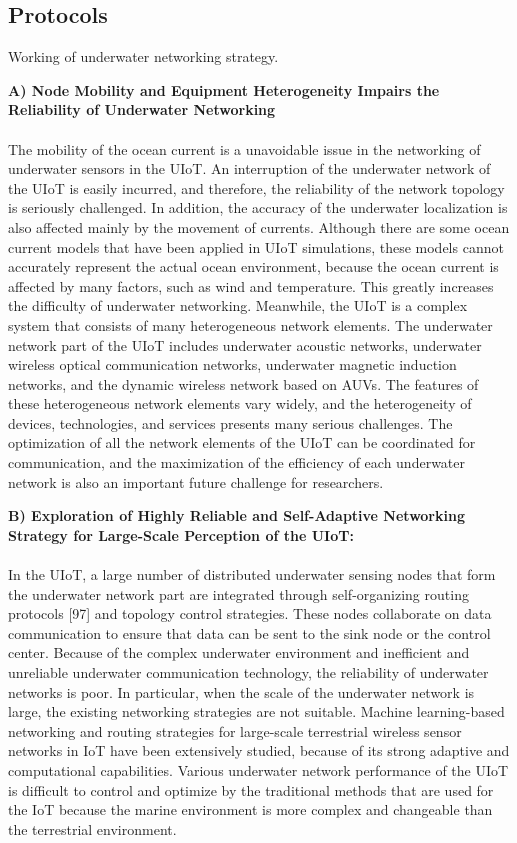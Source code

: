 \documentclass[a4paper,12pt]{article}
\begin{document}
\begin{multicols}{2}
\section{Protocols}
Working of underwater networking strategy.
\\
\item \textbf{A)	Node Mobility and Equipment Heterogeneity Impairs the Reliability of Underwater Networking}\\
\\
The mobility of the ocean current is a unavoidable issue in the networking of underwater sensors in the UIoT. An interruption of the underwater network of the UIoT is easily incurred, and therefore, the reliability of the network topology is seriously challenged. In addition, the accuracy of the underwater localization is also affected mainly by the movement of currents. Although there are some ocean current models that have been applied in UIoT simulations, these models cannot accurately represent the actual ocean environment, because the ocean current is affected by many factors, such as wind and temperature. This greatly increases the difficulty of underwater networking. Meanwhile, the UIoT is a complex system that consists of many heterogeneous network elements. The underwater network part of the UIoT includes underwater acoustic networks, underwater wireless optical communication networks, underwater magnetic induction networks, and the dynamic wireless network based on AUVs. The features of these heterogeneous network elements vary widely, and the heterogeneity of devices, technologies, and services presents many serious challenges. The optimization of all the network elements of the UIoT can be coordinated for communication, and the maximization of the efficiency of each underwater network is also an important future challenge for researchers.\\

\item\textbf{B)	Exploration of Highly Reliable and Self-Adaptive Networking Strategy for Large-Scale Perception of the UIoT:}\\
\\
In the UIoT, a large number of distributed underwater sensing nodes that form the underwater network part are integrated through self-organizing routing protocols [97] and topology control strategies. These nodes collaborate on data communication to ensure that data can be sent to the sink node or the control center. Because of the complex underwater environment and inefficient and unreliable underwater communication technology, the reliability of underwater networks is poor. In particular, when the scale of the underwater network is large, the existing networking strategies are not suitable. Machine learning-based networking and routing strategies for large-scale terrestrial wireless sensor networks in IoT have been extensively studied, because of its strong adaptive and computational capabilities. Various underwater network performance of the UIoT is difficult to control and optimize by the traditional methods that are used for the IoT because the marine environment is more complex and changeable than the terrestrial environment.


\end{multicols}
\end{document}

